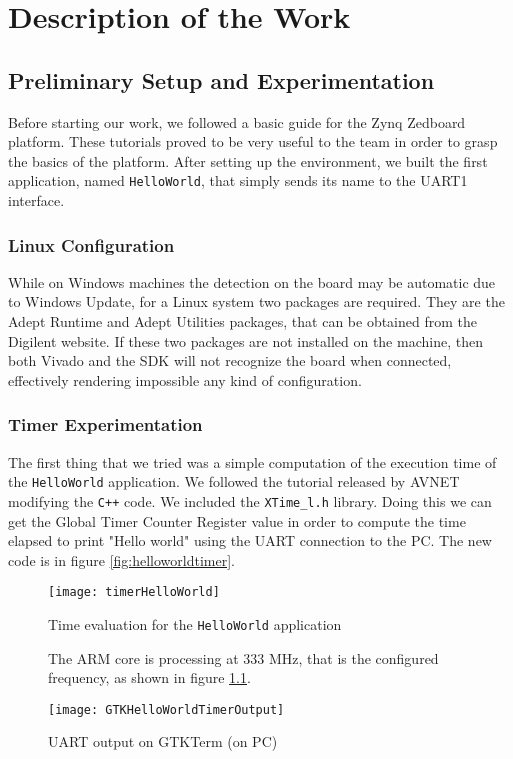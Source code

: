 \chapter{Description of the Work}
\label{chapter:description}
\section{Preliminary Setup and Experimentation}

Before starting our work, we followed a basic guide \cite{tutorial} for the Zynq Zedboard platform. These tutorials proved to be very useful to the team in order to grasp the basics of the platform. After setting up the environment, we built the first application, named \texttt{HelloWorld}, that simply sends its name to the UART1 interface.

\subsection{Linux Configuration}

While on Windows machines the detection on the board may be automatic due to Windows Update, for a Linux system two packages are required. They are the Adept Runtime and Adept Utilities packages, that can be obtained from the Digilent website. If these two packages are not installed on the machine, then both Vivado and the SDK will not recognize the board when connected, effectively rendering impossible any kind of configuration.

\subsection{Timer Experimentation}
The first thing that we tried was a simple computation of the execution time of the \texttt{HelloWorld} application. We followed the tutorial released by AVNET modifying the \texttt{C++} code. We included the \texttt{XTime\_l.h} library. Doing this we can get the Global Timer Counter Register value in order to compute the time elapsed to print "Hello world" using the UART connection to the PC. The new code is in figure \ref{fig:helloworldtimer}.

\begin{figure}[htbp]
	\centering
	\texttt{[image: timerHelloWorld]}
	\caption{Time evaluation for the \texttt{HelloWorld} application}
	\label{fig:helloworldtimer}
	
	\bigskip
	\noindent
	\begin{flushleft}
		The ARM core is processing at 333 MHz, that is the configured frequency, as shown in figure \ref{fig:helloworldtimeroutput}.
	\end{flushleft}
	\bigskip
	
	\centering
	\texttt{[image: GTKHelloWorldTimerOutput]}
	\caption{UART output on GTKTerm (on PC)}
	\label{fig:helloworldtimeroutput}
\end{figure}

